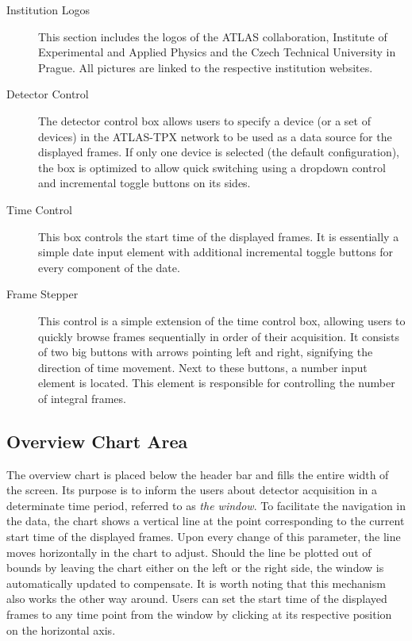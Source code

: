 \begin{description}
	\item[Institution Logos]
	This section includes the logos of the ATLAS collaboration, Institute of Experimental and Applied Physics and the Czech Technical University in Prague. All pictures are linked to the respective institution websites.

	\item[Detector Control]
	The detector control box allows users to specify a device (or a set of devices) in the ATLAS-TPX network to be used as a data source for the displayed frames. If only one device is selected (the default configuration), the box is optimized to allow quick switching using a dropdown control and incremental toggle buttons on its sides.

	\item[Time Control]
	This box controls the start time of the displayed frames. It is essentially a simple date input element with additional incremental toggle buttons for every component of the date.

	\item[Frame Stepper]
	This control is a simple extension of the time control box, allowing users to quickly browse frames sequentially in order of their acquisition. It consists of two big buttons with arrows pointing left and right, signifying the direction of time movement. Next to these buttons, a number input element is located. This element is responsible for controlling the number of integral frames.
\end{description}

\subsection{Overview Chart Area}
The overview chart is placed below the header bar and fills the entire width of the screen. Its purpose is to inform the users about detector acquisition in a determinate time period, referred to as \textit{the window}. To facilitate the navigation in the data, the chart shows a vertical line at the point corresponding to the current start time of the displayed frames. Upon every change of this parameter, the line moves horizontally in the chart to adjust. Should the line be plotted out of bounds by leaving the chart either on the left or the right side, the window is automatically updated to compensate. It is worth noting that this mechanism also works the other way around. Users can set the start time of the displayed frames to any time point from the window by clicking at its respective position on the horizontal axis.

